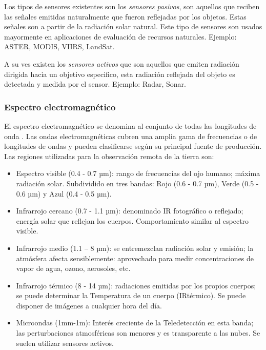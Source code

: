 Los tipos de sensores existentes son los  \textit{sensores pasivos}, son aquellos que reciben las señales emitidas naturalmente que fueron reflejadas por los objetos. Estas señales son a partir de la radiación solar natural. Este tipo de sensores son  usados mayormente en aplicaciones de evaluación de recursos naturales. Ejemplo: ASTER, MODIS, VIIRS, LandSat.

A su ves existen los \textit{sensores activos} que son aquellos que emiten radiación dirigida hacia un objetivo especifico, esta radiación reflejada del objeto es detectada y medida por el sensor. Ejemplo: Radar, Sonar.

\subsubsection{Espectro electromagnético}

El espectro electromagnético se denomina al conjunto de todas las longitudes de onda \citep{chuvieco}. Las ondas electromagnéticas cubren una amplia gama de frecuencias o de longitudes de ondas y pueden clasificarse según su principal fuente de producción. 
Las regiones utilizadas para la observación remota de la tierra son:
\begin{itemize}
\item Espectro visible (0.4 - 0.7 µm): rango de frecuencias del ojo humano; máxima radiación solar. Subdividido en tres bandas: Rojo (0.6 - 0.7 µm), Verde (0.5 - 0.6 µm) y Azul (0.4 - 0.5 µm).

\item Infrarrojo cercano (0.7 - 1.1 µm): denominado IR fotográfico o reflejado; energía solar que reflejan los cuerpos. Comportamiento similar al espectro visible.

\item Infrarrojo medio (1.1 – 8 µm): se entremezclan radiación solar y emisión; la atmósfera afecta sensiblemente: aprovechado para medir concentraciones de vapor de agua, ozono, aerosoles, etc.

\item Infrarrojo térmico (8 - 14 µm): radiaciones emitidas por los propios cuerpos; se puede determinar la Temperatura de un cuerpo (IRtérmico). Se puede disponer de imágenes a cualquier hora del día.

\item Microondas (1mm-1m): Interés creciente de la Teledetección en esta banda; las perturbaciones atmosféricas son menores y es transparente a las nubes. Se suelen utilizar sensores activos. 

\end{itemize}

